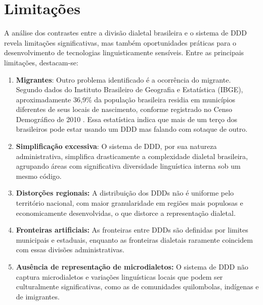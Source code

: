 \section{Limitações}
A análise dos contrastes entre a divisão dialetal brasileira e o sistema de DDD revela limitações significativas, mas também oportunidades práticas para o desenvolvimento de tecnologias linguisticamente sensíveis. Entre as principais limitações, destacam-se:
\begin{enumerate}

    \item \textbf{Migrantes}: 
Outro problema identificado é a ocorrência do migrante.
Segundo dados do Instituto Brasileiro de Geografia e Estatística (IBGE), aproximadamente 36,9\% da população brasileira residia em municípios diferentes de seus locais de nascimento, conforme registrado no Censo Demográfico de 2010 \cite{noauthor_ibge_nodate}. Essa estatística indica que mais de um terço dos brasileiros pode estar usando um DDD mas falando com sotaque de outro.
    \item \textbf{Simplificação excessiva}: O sistema de DDD, por sua natureza administrativa, simplifica drasticamente a complexidade dialetal brasileira, agrupando áreas com significativa diversidade linguística interna sob um mesmo código.
    \item \textbf{Distorções regionais:} A distribuição dos DDDs não é uniforme pelo território nacional, com maior granularidade em regiões mais populosas e economicamente desenvolvidas, o que distorce a representação dialetal.
    \item \textbf{Fronteiras artificiais:} As fronteiras entre DDDs são definidas por limites municipais e estaduais, enquanto as fronteiras dialetais raramente coincidem com essas divisões administrativas.
    \item \textbf{Ausência de representação de microdialetos:} O sistema de DDD não captura microdialetos e variações linguísticas locais que podem ser culturalmente significativas, como as de comunidades quilombolas, indígenas e de imigrantes.
\end{enumerate}


